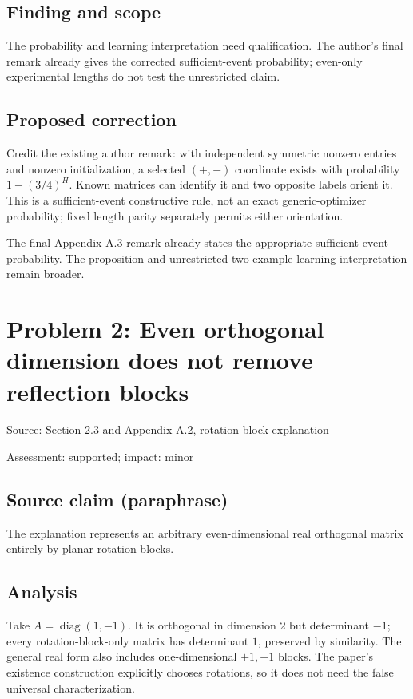 \documentclass[11pt]{article}
\begin{document}
\subsection*{Finding and scope}

The probability and learning interpretation need qualification. The author’s final remark already gives the corrected sufficient-event probability; even-only experimental lengths do not test the unrestricted claim.

\subsection*{Proposed correction}

Credit the existing author remark: with independent symmetric nonzero entries and nonzero initialization, a selected \((+,-)\) coordinate exists with probability \(1-(3/4)^H\). Known matrices can identify it and two opposite labels orient it. This is a sufficient-event constructive rule, not an exact generic-optimizer probability; fixed length parity separately permits either orientation.

The final Appendix A.3 remark already states the appropriate sufficient-event probability. The proposition and unrestricted two-example learning interpretation remain broader.

\section*{Problem 2: Even orthogonal dimension does not remove reflection blocks}

Source: Section 2.3 and Appendix A.2, rotation-block explanation

Assessment: supported; impact: minor

\subsection*{Source claim (paraphrase)}

The explanation represents an arbitrary even-dimensional real orthogonal matrix entirely by planar rotation blocks.

\subsection*{Analysis}

Take \(A=\operatorname{diag}(1,-1)\). It is orthogonal in dimension \(2\) but determinant \(-1\); every rotation-block-only matrix has determinant \(1\), preserved by similarity. The general real form also includes one-dimensional \(+1,-1\) blocks. The paper’s existence construction explicitly chooses rotations, so it does not need the false universal characterization.
\end{document}
